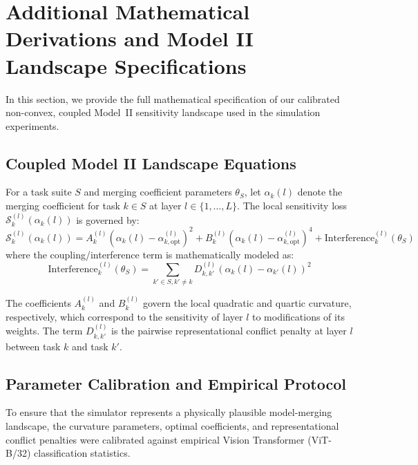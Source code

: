 \newpage
\appendix
\onecolumn


\section{Additional Mathematical Derivations and Model II Landscape Specifications}
\label{app:model_ii}

In this section, we provide the full mathematical specification of our calibrated non-convex, coupled Model~II sensitivity landscape used in the simulation experiments.

\subsection{Coupled Model II Landscape Equations}
For a task suite $S$ and merging coefficient parameters $\theta_S$, let $\alpha_k(l)$ denote the merging coefficient for task $k \in S$ at layer $l \in \{1, \dots, L\}$.
The local sensitivity loss $\mathcal{S}_k^{(l)}(\alpha_k(l))$ is governed by:
\begin{equation}
\mathcal{S}_k^{(l)}(\alpha_k(l)) = A_k^{(l)} \left( \alpha_k(l) - \alpha_{k, \text{opt}}^{(l)} \right)^2 + B_k^{(l)} \left( \alpha_k(l) - \alpha_{k, \text{opt}}^{(l)} \right)^4 + \text{Interference}_k^{(l)}(\theta_S)
\end{equation}
where the coupling/interference term is mathematically modeled as:
\begin{equation}
\text{Interference}_k^{(l)}(\theta_S) = \sum_{k' \in S, k' \neq k} D_{k, k'}^{(l)} \left( \alpha_k(l) - \alpha_{k'}(l) \right)^2
\end{equation}

The coefficients $A_k^{(l)}$ and $B_k^{(l)}$ govern the local quadratic and quartic curvature, respectively, which correspond to the sensitivity of layer $l$ to modifications of its weights.
The term $D_{k, k'}^{(l)}$ is the pairwise representational conflict penalty at layer $l$ between task $k$ and task $k'$.

\subsection{Parameter Calibration and Empirical Protocol}
To ensure that the simulator represents a physically plausible model-merging landscape, the curvature parameters, optimal coefficients, and representational conflict penalties were calibrated against empirical Vision Transformer (ViT-B/32) classification statistics.

